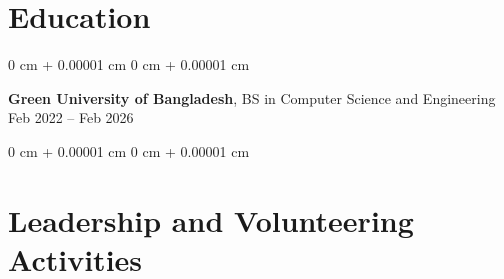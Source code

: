 \documentclass[10pt, letterpaper]{article}
\newenvironment{highlights}{
    \begin{itemize}[
        topsep=0.10 cm,
        parsep=0.10 cm,
        partopsep=0pt,
        itemsep=0pt,
        leftmargin=0 cm + 10pt
    ]
}{
    \end{itemize}
} %
\newenvironment{onecolentry}{
    \begin{adjustwidth}{
        0 cm + 0.00001 cm
    }{
        0 cm + 0.00001 cm
    }
}{
    \end{adjustwidth}
} %
\newenvironment{twocolentry}[2][]{
    \onecolentry
    \def\secondColumn{#2}
    \setcolumnwidth{\fill, 4.5 cm}
    \begin{paracol}{2}
}{
    \switchcolumn \raggedleft \secondColumn
    \end{paracol}
    \endonecolentry
} %
\begin{document}
     \section{Education}



        
        \begin{twocolentry}{
            Feb 2022 – Feb 2026
        }
            \textbf{Green University of Bangladesh}, BS in Computer Science and Engineering\end{twocolentry}

        \begin{onecolentry}
            \begin{highlights}
            \end{highlights}
        \end{onecolentry}



    
 

    


    
    \section{Leadership and Volunteering Activities}
\end{document}
